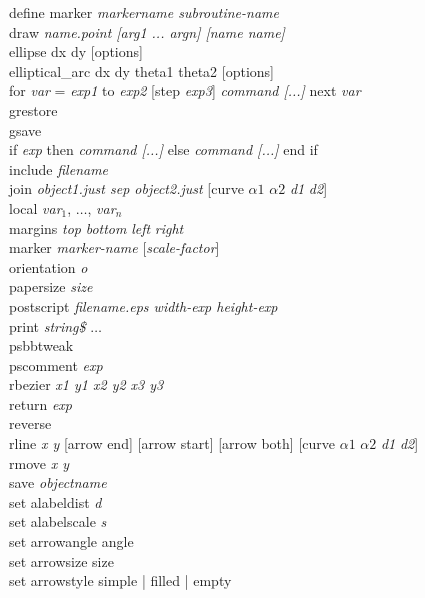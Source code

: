 {\sf define marker {\it markername  subroutine-name}} \\
{\sf draw {\it name.point [{\it arg1} ... {\it argn}] [name {\it name}]}} \\
{\sf ellipse dx dy [options]} \\
{\sf elliptical\_arc dx dy theta1 theta2 [options]} \\
{\sf for {\it var} = {\it exp1} to {\it exp2} [step {\it exp3}] {\it command [...]} next {\it var}}  \\
{\sf grestore}  \\
{\sf gsave}  \\
{\sf if {\it exp} then {\it command [...]} else {\it command [...]} end if}  \\
{\sf include {\it filename}}  \\
{\sf join {\it object1.just sep object2.just} [curve {\it $\alpha1$} {\it $\alpha2$} {\it d1} {\it d2}]}   \\
{\sf local {\it var}$_1$, $\ldots$, {\it var}$_n$} \\
{\sf margins {\it top} {\it bottom} {\it left} {\it right}} \\
{\sf marker {\it marker-name} [{\it scale-factor}]}  \\
{\sf orientation {\it o}} \\
{\sf papersize {\it size}} \\
{\sf postscript {\it filename.eps  width-exp height-exp}}   \\
{\sf print {\it string\$} $\ldots$} \\
{\sf psbbtweak} \\
{\sf pscomment} {\it exp} \\
{\sf rbezier {\it x1 y1 x2 y2 x3 y3}}  \\
{\sf return} {\it exp}  \\
{\sf reverse }  \\
{\sf rline {\it x y} [arrow end] [arrow start] [arrow both]  [curve {\it $\alpha1$} {\it $\alpha2$} {\it d1} {\it d2}]}   \\
{\sf rmove {\it x y}}  \\
{\sf save {\it objectname}}   \\
{\sf set alabeldist {\it d}}  \\
{\sf set alabelscale {\it s}}  \\
{\sf set arrowangle {\sf angle}}  \\
{\sf set arrowsize {\sf size}}  \\
{\sf set arrowstyle {\sf simple | filled | empty}} \\

